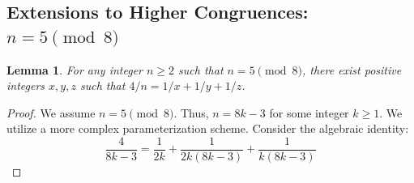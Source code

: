 \documentclass[12pt,a4paper]{article}
\newtheorem{lemma}[theorem]{Lemma}
\begin{document}
\newpage
\subsection{Extensions to Higher Congruences: $n = 5 \pmod 8$}
\begin{lemma}
For any integer $n \geq 2$ such that $n = 5 \pmod 8$, there exist positive integers $x, y, z$ such that $4/n = 1/x + 1/y + 1/z$.
\end{lemma}
\begin{proof}
We assume $n = 5 \pmod 8$. Thus, $n = 8k - 3$ for some integer $k \ge 1$.
We utilize a more complex parameterization scheme.
Consider the algebraic identity:
\begin{equation}
\frac{4}{8k-3} = \frac{1}{2k} + \frac{1}{2k(8k-3)} + \frac{1}{k(8k-3)}
\end{equation}


\end{proof}
\end{document}
